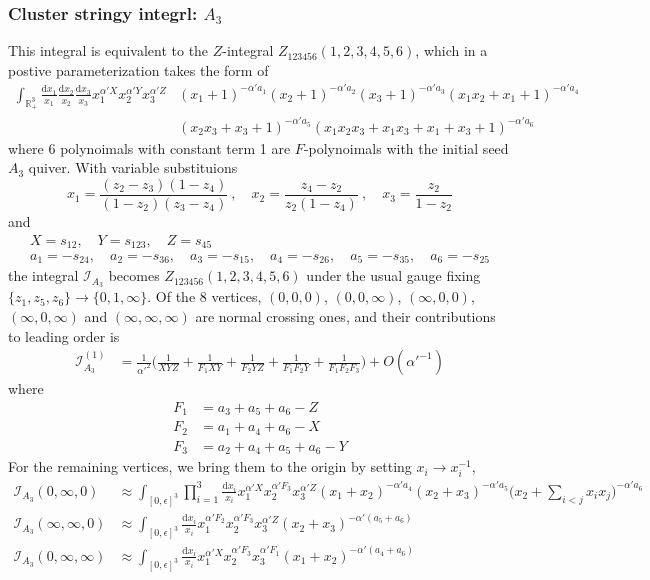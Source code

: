 \documentclass[12pt]{article}
\theoremstyle{definition}
\theoremstyle{plain}
\newcommand{\dif}{\mathrm{d}} %
\begin{document}
\subsubsection*{Cluster stringy integrl: $A_3$}

This integral is equivalent to the $Z$-integral $Z_{123456}(1,2,3,4,5,6)$, which in a postive parameterization takes the form of 
\begin{align*}
	\int_{\mathbb R_+^3} \frac{\dif x_1}{x_1}\frac{\dif x_2}{x_2}\frac{\dif x_3}{x_3}
	x_1^{\alpha' X}x_2^{\alpha' Y}x_3^{\alpha' Z}
	&(x_1 + 1)^{-\alpha' a_1}
	(x_2 + 1)^{-\alpha'a_2}
	(x_3 + 1)^{-\alpha'a_3}
	(x_1x_2 + x_1 + 1)^{-\alpha'a_4}\\
	&(x_2x_3 + x_3 + 1)^{-\alpha'a_5}
	(x_1x_2x_3 + x_1x_3 + x_1 + x_3 + 1)^{-\alpha'a_6}
\end{align*}
where 6 polynoimals with constant term 1 are $F$-polynoimals with the initial seed $A_{3}$ quiver. With variable substituions
\[
x_{1}=\frac{(z_{2}-z_{3})(1-z_{4})}{(1-z_{2})(z_{3}-z_{4})}\:,\quad x_{2}=\frac{z_{4}-z_{2}}{z_{2}(1-z_{4})}\:, \quad
x_{3}=\frac{z_{2}}{1-z_{2}}
\]
and
\begin{gather*}
	X=s_{12},\quad Y=s_{123},\quad Z=s_{45} \\
	a_{1}=-s_{24},\quad a_{2}=-s_{36},\quad a_{3}=-s_{15},\quad a_{4}=-s_{26},\quad a_{5}=-s_{35},\quad a_{6}=-s_{25}	
\end{gather*}
the integral $\mathcal{I}_{A_{3}}$ becomes $Z_{123456}(1,2,3,4,5,6)$ under the usual gauge fixing $\{z_{1},z_{5},z_{6}\}\to\{0,1,\infty\}$. Of the 8 vertices, $(0,0,0)$, $(0,0,\infty)$, $(\infty,0,0)$, $(\infty,0,\infty)$ and $(\infty,\infty,\infty)$ are normal crossing ones, and their contributions to leading order is 
\begin{align*}
	\mathcal{I}_{A_{3}}^{(1)}&=\frac{1}{\alpha'^{2}}\biggl(\frac{1}{XYZ}+\frac{1}{F_{1}XY} +\frac{1}{F_{2}YZ}+\frac{1}{F_{1}F_{2}Y} 
	+\frac{1}{F_{1}F_{2}F_{3}}\biggr) +O(\alpha'^{-1})
\end{align*}	
where
\begin{align*}
	F_{1} &= a_{3}+a_{5}+a_{6}-Z \\
	F_{2} &= a_{1}+a_{4}+a_{6}-X \\
	F_{3} &= a_{2}+a_{4}+a_{5}+a_{6}-Y
\end{align*}
For the remaining vertices, we bring them to the origin by setting $x_{i}\to x_{i}^{-1}$,
\begin{align*}
	\mathcal{I}_{A_{3}}(0,\infty,0)&\approx\int_{[0,\epsilon]^{3}}\prod_{i=1}^{3}\frac{\dif x_{i}}{x_{i}} x_{1}^{\alpha' X}
	x_{2}^{\alpha' F_{3}}x_{3}^{\alpha' Z}(x_{1}+x_{2})^{-\alpha' a_{4}}(x_{2}+x_{3})^{-\alpha' a_{5}}
	\biggl(x_{2}+\sum_{i<j} x_{i}x_{j}\biggr)^{-\alpha' a_{6}} \\
	\mathcal{I}_{A_{3}}(\infty,\infty,0)&\approx \int_{[0,\epsilon]^{3}}\frac{\dif x_{i}}{x_{i}}x_{1}^{\alpha' F_{2}}x_{2}^{\alpha' F_{3}}x_{3}^{\alpha'Z} (x_{2}+x_{3})^{-\alpha'(a_{5}+a_{6})} \\
	\mathcal{I}_{A_{3}}(0,\infty,\infty)&\approx \int_{[0,\epsilon]^{3}}\frac{\dif x_{i}}{x_{i}}x_{1}^{\alpha' X}x_{2}^{\alpha' F_{3}}x_{3}^{\alpha' F_{1}} (x_{1}+x_{2})^{-\alpha'(a_{4}+a_{6})}
\end{align*}
\end{document}
